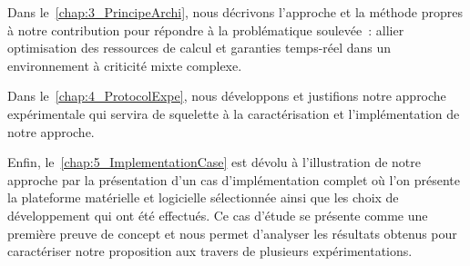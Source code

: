 \documentclass[french, a4paper, 11pt, twoside, pdftex]{StyleThese}
\begin{document}
Dans le~\autoref{chap:3_PrincipeArchi}, nous décrivons l'approche et la méthode propres à notre contribution pour répondre à la problématique soulevée~: allier optimisation des ressources de calcul et garanties temps-réel dans un environnement à criticité mixte complexe.

Dans le~\autoref{chap:4_ProtocolExpe}, nous développons et justifions notre approche expérimentale qui servira de squelette à la caractérisation et l'implémentation de notre approche.

Enfin, le~\autoref{chap:5_ImplementationCase} est dévolu à l’illustration de notre approche par la présentation d'un cas d'implémentation complet où l'on présente la plateforme matérielle et logicielle sélectionnée ainsi que les choix de développement qui ont été effectués. Ce cas d'étude se présente comme une première preuve de concept et nous permet d'analyser les résultats obtenus pour caractériser notre proposition aux travers de plusieurs expérimentations. 
\end{document}
